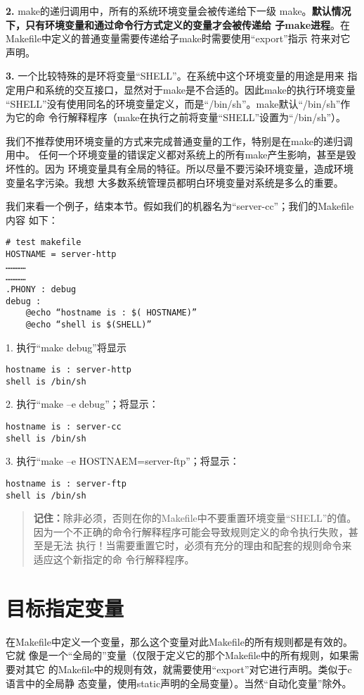 \textbf{2.} make的递归调用中，所有的系统环境变量会被传递给下一级
make。\textbf{默认情况下，只有环境变量和通过命令行方式定义的变量才会被传递给
子make进程}。在Makefile中定义的普通变量需要传递给子make时需要使用“export”指示
符来对它声明。


\textbf{3.} 一个比较特殊的是环将变量“SHELL”。在系统中这个环境变量的用途是用来
指定用户和系统的交互接口，显然对于make是不合适的。因此make的执行环境变量
“SHELL”没有使用同名的环境变量定义，而是“/bin/sh”。make默认“/bin/sh”作为它的命
令行解释程序（make在执行之前将变量“SHELL”设置为“/bin/sh”）。

我们不推荐使用环境变量的方式来完成普通变量的工作，特别是在make的递归调用中。
任何一个环境变量的错误定义都对系统上的所有make产生影响，甚至是毁坏性的。因为
环境变量具有全局的特征。所以尽量不要污染环境变量，造成环境变量名字污染。我想
大多数系统管理员都明白环境变量对系统是多么的重要。

我们来看一个例子，结束本节。假如我们的机器名为“server-cc”；我们的Makefile内容
如下：
\begin{Verbatim}[]
# test makefile
HOSTNAME = server-http
…………
…………
.PHONY : debug
debug :
    @echo “hostname is : $( HOSTNAME)”
    @echo “shell is $(SHELL)”
\end{Verbatim}

1. 执行“make debug”将显示
\begin{Verbatim}[]
hostname is : server-http
shell is /bin/sh
\end{Verbatim}

2. 执行“make –e debug”；将显示：
\begin{Verbatim}[]
hostname is : server-cc
shell is /bin/sh
\end{Verbatim}

3. 执行“make –e HOSTNAEM=server-ftp”；将显示：
\begin{Verbatim}[]
hostname is : server-ftp
shell is /bin/sh
\end{Verbatim}

\begin{quote}\kaishu
\textbf{记住：}除非必须，否则在你的Makefile中不要重置环境变量“SHELL”的值。
因为一个不正确的命令行解释程序可能会导致规则定义的命令执行失败，甚至是无法
执行！当需要重置它时，必须有充分的理由和配套的规则命令来适应这个新指定的命
令行解释程序。
\end{quote}

\section{目标指定变量}
在Makefile中定义一个变量，那么这个变量对此Makefile的所有规则都是有效的。它就
像是一个“全局的”变量（仅限于定义它的那个Makefile中的所有规则，如果需要对其它
的Makefile中的规则有效，就需要使用“export”对它进行声明。类似于c语言中的全局静
态变量，使用static声明的全局变量）。当然“自动化变量”除外。

